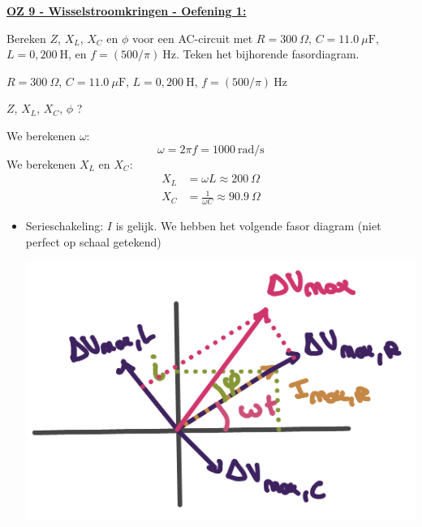 \textbf{\underline{OZ 9 - Wisselstroomkringen - Oefening 1:}}
\vspace{0.5cm}

Bereken $Z$, $X_L$, $X_C$ en $\phi$ voor een AC-circuit met $R = 300 \ \Omega$, $C = 11.0 \ \mu\text{F}$, $L = 0,200 \ \text{H}$, en $f = (500/\pi) \ \text{Hz}$. Teken het bijhorende fasordiagram.


\begin{description}[labelwidth=1.5cm, leftmargin=!]
    \item[Geg. :]  $R = 300 \ \Omega$, $C = 11.0 \ \mu\text{F}$, $L = 0,200 \ \text{H}$, $f = (500/\pi) \ \text{Hz}$ 
    \item[Gevr. :] $Z$, $X_L$, $X_C$, $\phi$ ?
    \item[Opl. :]   
        We berekenen $\omega$:
        \begin{equation*}
            \omega = 2\pi f = 1000 \ \text{rad/s}
        \end{equation*}
        We berekenen $X_L$ en $X_C$:
        \begin{align*}
            X_L &= \omega L \approx 200 \ \Omega \\ X_C &= \frac{1}{\omega C} \approx 90.9 \ \Omega
        \end{align*}
        \begin{itemize}
            \item Serieschakeling: $I$ is gelijk. We hebben het volgende fasor diagram (niet perfect op schaal getekend)
                \begin{center}
                    \includegraphics[scale=0.3]{oz09/resources/Oz9Oef1-serie.png}

\end{center}
\end{itemize}
\end{description}
